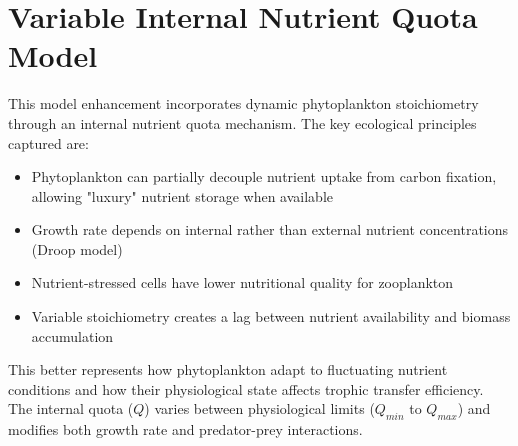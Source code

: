 \section{Variable Internal Nutrient Quota Model}

This model enhancement incorporates dynamic phytoplankton stoichiometry through an internal nutrient quota mechanism. The key ecological principles captured are:

\begin{itemize}
\item Phytoplankton can partially decouple nutrient uptake from carbon fixation, allowing "luxury" nutrient storage when available
\item Growth rate depends on internal rather than external nutrient concentrations (Droop model)
\item Nutrient-stressed cells have lower nutritional quality for zooplankton
\item Variable stoichiometry creates a lag between nutrient availability and biomass accumulation
\end{itemize}

This better represents how phytoplankton adapt to fluctuating nutrient conditions and how their physiological state affects trophic transfer efficiency. The internal quota ($Q$) varies between physiological limits ($Q_{min}$ to $Q_{max}$) and modifies both growth rate and predator-prey interactions.
